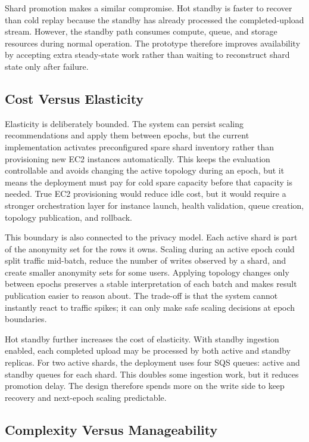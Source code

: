 \documentclass[conference]{IEEEtran}
\begin{document}
Shard promotion makes a similar compromise. Hot standby is faster to recover than cold replay because the standby has already processed the completed-upload stream. However, the standby path consumes compute, queue, and storage resources during normal operation. The prototype therefore improves availability by accepting extra steady-state work rather than waiting to reconstruct shard state only after failure.

\subsection{Cost Versus Elasticity}

Elasticity is deliberately bounded. The system can persist scaling recommendations and apply them between epochs, but the current implementation activates preconfigured spare shard inventory rather than provisioning new EC2 instances automatically. This keeps the evaluation controllable and avoids changing the active topology during an epoch, but it means the deployment must pay for cold spare capacity before that capacity is needed. True EC2 provisioning would reduce idle cost, but it would require a stronger orchestration layer for instance launch, health validation, queue creation, topology publication, and rollback.

This boundary is also connected to the privacy model. Each active shard is part of the anonymity set for the rows it owns. Scaling during an active epoch could split traffic mid-batch, reduce the number of writes observed by a shard, and create smaller anonymity sets for some users. Applying topology changes only between epochs preserves a stable interpretation of each batch and makes result publication easier to reason about. The trade-off is that the system cannot instantly react to traffic spikes; it can only make safe scaling decisions at epoch boundaries.

Hot standby further increases the cost of elasticity. With standby ingestion enabled, each completed upload may be processed by both active and standby replicas. For two active shards, the deployment uses four SQS queues: active and standby queues for each shard. This doubles some ingestion work, but it reduces promotion delay. The design therefore spends more on the write side to keep recovery and next-epoch scaling predictable.

\subsection{Complexity Versus Manageability}
\end{document}
